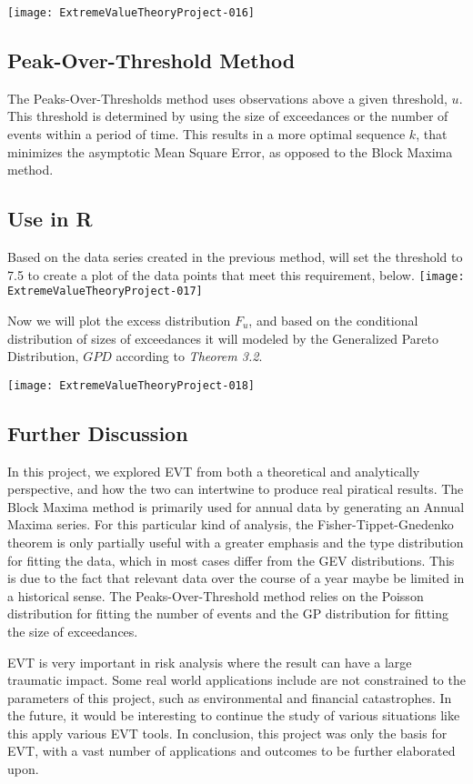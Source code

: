 \documentclass[11pt,a4paper]{article}
\theoremstyle{plain}
\begin{document}
\texttt{[image: ExtremeValueTheoryProject-016]}


 
\subsection*{Peak-Over-Threshold Method}

The Peaks-Over-Thresholds method uses observations above a given threshold, $u$. This threshold is determined by using the size of exceedances or the number of events within a period of time. This results in a more optimal sequence $k$, that minimizes the asymptotic Mean Square Error, as opposed to the Block Maxima method.

\subsection*{Use in R}
Based on the data series created in the previous method, will set the threshold to 7.5 to create a plot of the data points that meet this requirement, below.
\texttt{[image: ExtremeValueTheoryProject-017]}

Now we will plot the excess distribution  $F_u$, and based on the conditional distribution of sizes of exceedances it will modeled by the Generalized Pareto Distribution, $GPD$ according to \emph{Theorem 3.2}.

\texttt{[image: ExtremeValueTheoryProject-018]}

\subsection*{Further Discussion}
In this project, we explored EVT from both a theoretical and  analytically perspective, and how the two can intertwine to produce real piratical results. The Block Maxima method is primarily used for annual data by generating an Annual Maxima series. For this particular kind of analysis, the Fisher-Tippet-Gnedenko theorem is only partially useful with a greater emphasis and the type distribution for fitting the data, which in most cases differ from the GEV distributions. This is due to the fact that relevant data over the course of a year maybe be limited in a historical sense. The Peaks-Over-Threshold method relies on the Poisson distribution for fitting the number of events and the GP distribution for fitting the size of exceedances.     


EVT is very important in risk analysis where the result can have a large traumatic impact. Some real world applications include are not constrained to the parameters of this
project, such as environmental and financial catastrophes.
In the future, it would be interesting to continue the study of various situations like this apply various EVT tools. In conclusion, this project was only the basis for EVT, with a vast number of applications and outcomes to be further elaborated upon.
\end{document}
